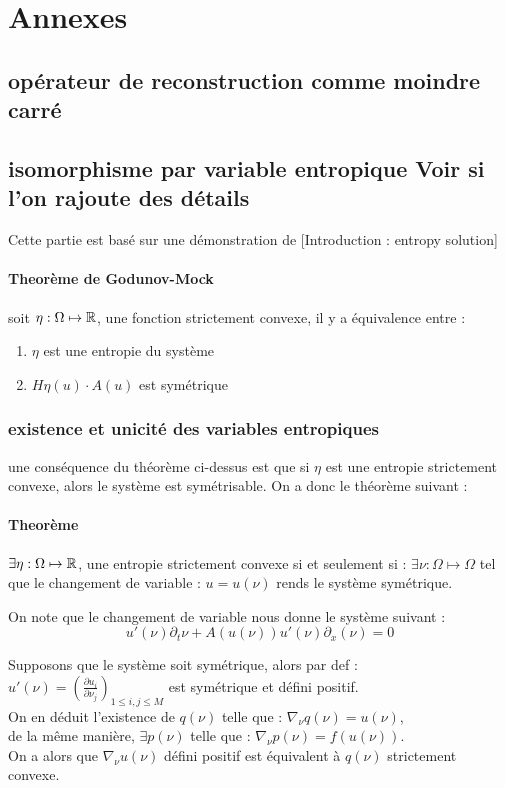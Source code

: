 \newpage
\section{Annexes}
\subsection{opérateur de reconstruction comme moindre carré}
\subsection{isomorphisme par variable entropique {\color{red} Voir si l'on rajoute des détails } \label{entropie_Annexes}}

Cette partie est basé sur une démonstration de \cite{godlewski2021numerical} [Introduction : entropy solution]
\paragraph{Theorème de Godunov-Mock}
soit $\eta :\Omega \mapsto \mathbb{R}$, une fonction strictement convexe, il y a équivalence entre :
\begin{enumerate}
    \item $\eta$ est une entropie du système
    \item $H\eta(u)\cdot A(u)$ est symétrique
\end{enumerate}
\subsubsection{existence et unicité des variables entropiques}
une conséquence du théorème ci-dessus est que si $\eta$ est une entropie strictement convexe, alors le système est symétrisable.
On a donc le théorème suivant : 

\paragraph{Theorème}
$\exists \eta :\Omega \mapsto \mathbb{R}$, une entropie strictement convexe si et seulement si : $\exists \nu : \Omega \mapsto \Omega$ tel que le changement de variable : $u = u(\nu)$ rends le système symétrique.

On note que le changement de variable nous donne le système suivant : 
$$u'(\nu) \partial_t \nu + A(u(\nu)) u'(\nu) \partial_x(\nu) = 0 $$

Supposons que le système soit symétrique, alors par def : $u'(\nu) = (\frac{\partial u_i}{\partial \nu_j})_{1\leq i,j \leq M} $  est symétrique et défini positif.\\
On en déduit l'existence de $q(\nu)$ telle que : $\nabla_\nu q(\nu) = u(\nu)$, \\
de la même manière, $\exists p(\nu)$ telle que : $\nabla_\nu p(\nu) = f(u(\nu))$.\\
On a alors que $\nabla_\nu u(\nu)$ défini positif est équivalent à $q(\nu)$ strictement convexe.\\

